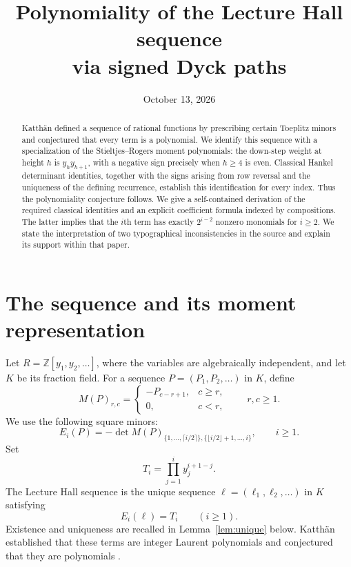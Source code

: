 \documentclass[11pt]{article}
\title{Polynomiality of the Lecture Hall sequence\\via signed Dyck paths}
\author{}
\date{October 13, 2026}
\theoremstyle{remark}
\newcommand{\Z}{\mathbb Z}
\newcommand{\LH}{\ell}
\begin{document}
\maketitle
\begin{abstract}
Katth\"an defined a sequence of rational functions by prescribing certain
Toeplitz minors and conjectured that every term is a polynomial. We identify
this sequence with a specialization of the Stieltjes--Rogers moment
polynomials: the down-step weight at height $h$ is $y_hy_{h+1}$, with a
negative sign precisely when $h\ge4$ is even. Classical Hankel determinant
identities, together with the signs arising from row reversal and the
uniqueness of the defining recurrence, establish this identification for
every index. Thus the polynomiality conjecture follows. We give a
self-contained derivation of the required classical identities and an
explicit coefficient formula indexed by compositions. The latter implies
that the $i$th term has exactly $2^{i-2}$ nonzero monomials for $i\ge2$.
We state the interpretation of two typographical inconsistencies in the
source and explain its support within that paper.
\end{abstract}

\section{The sequence and its moment representation}

Let $R=\Z[y_1,y_2,\ldots]$, where the variables are algebraically
independent, and let $K$ be its fraction field. For a sequence
$P=(P_1,P_2,\ldots)$ in $K$, define
\[
 M(P)_{r,c}=\begin{cases}-P_{c-r+1},&c\ge r,\\0,&c<r,\end{cases}
 \qquad r,c\ge1.
\]
We use the following square minors:
\begin{equation}\label{eq:E}
 E_i(P)=-\det M(P)_{
 \{1,\ldots,\lceil i/2\rceil\},
 \{\lfloor i/2\rfloor+1,\ldots,i\}},\qquad i\ge1.
\end{equation}
Set
\begin{equation}\label{eq:T}
 T_i=\prod_{j=1}^{i}y_j^{i+1-j}.
\end{equation}
The Lecture Hall sequence is the unique sequence
$\LH=(\LH_1,\LH_2,\ldots)$ in $K$ satisfying
\begin{equation}\label{eq:definition}
 E_i(\LH)=T_i\qquad(i\ge1).
\end{equation}
Existence and uniqueness are recalled in Lemma~\ref{lem:unique} below.
Katth\"an \cite[Definition 3.1 and Proposition 3.3]{Katthan} established
that these terms are integer Laurent polynomials and conjectured that
they are polynomials \cite[Conjecture 3.4]{Katthan}.
\end{document}
